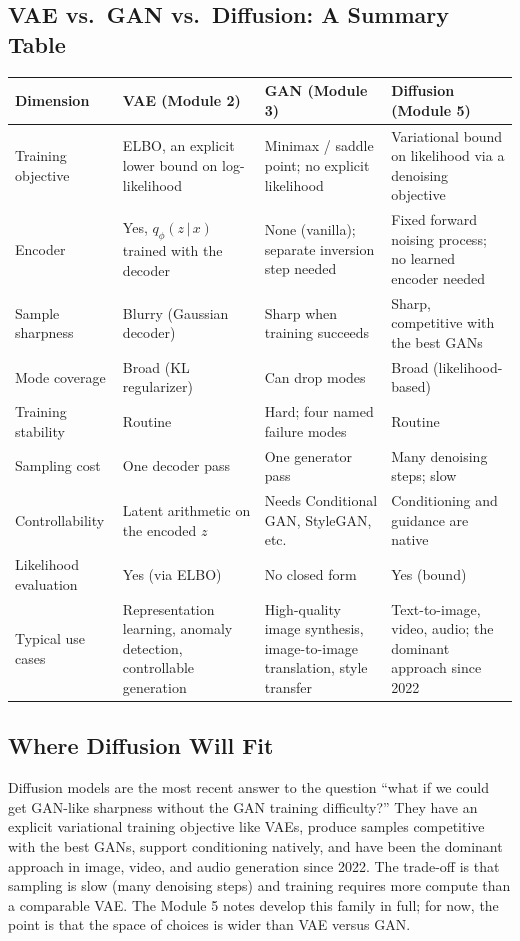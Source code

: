 \documentclass[11pt]{article}
\newcommand{\given}{\,\vert\,}
\theoremstyle{remark}
\begin{document}
\subsection{VAE vs.\ GAN vs.\ Diffusion: A Summary Table}

\begin{center}
\renewcommand{\arraystretch}{1.2}
\begin{tabular}{@{}p{2.9cm}p{4.0cm}p{4.0cm}p{4.0cm}@{}}
\toprule
\textbf{Dimension} & \textbf{VAE (Module 2)} & \textbf{GAN (Module 3)} & \textbf{Diffusion (Module 5)} \\
\midrule
Training objective & ELBO, an explicit lower bound on log-likelihood & Minimax / saddle point; no explicit likelihood & Variational bound on likelihood via a denoising objective \\
Encoder & Yes, $q_\phi(z\given x)$ trained with the decoder & None (vanilla); separate inversion step needed & Fixed forward noising process; no learned encoder needed \\
Sample sharpness & Blurry (Gaussian decoder) & Sharp when training succeeds & Sharp, competitive with the best GANs \\
Mode coverage & Broad (KL regularizer) & Can drop modes & Broad (likelihood-based) \\
Training stability & Routine & Hard; four named failure modes & Routine \\
Sampling cost & One decoder pass & One generator pass & Many denoising steps; slow \\
Controllability & Latent arithmetic on the encoded $z$ & Needs Conditional GAN, StyleGAN, etc. & Conditioning and guidance are native \\
Likelihood evaluation & Yes (via ELBO) & No closed form & Yes (bound) \\
Typical use cases & Representation learning, anomaly detection, controllable generation & High-quality image synthesis, image-to-image translation, style transfer & Text-to-image, video, audio; the dominant approach since 2022 \\
\bottomrule
\end{tabular}
\end{center}

\subsection{Where Diffusion Will Fit}

Diffusion models are the most recent answer to the question ``what if we could get GAN-like sharpness without the GAN training difficulty?'' They have an explicit variational training objective like VAEs, produce samples competitive with the best GANs, support conditioning natively, and have been the dominant approach in image, video, and audio generation since 2022. The trade-off is that sampling is slow (many denoising steps) and training requires more compute than a comparable VAE. The Module 5 notes develop this family in full; for now, the point is that the space of choices is wider than VAE versus GAN.
\end{document}
